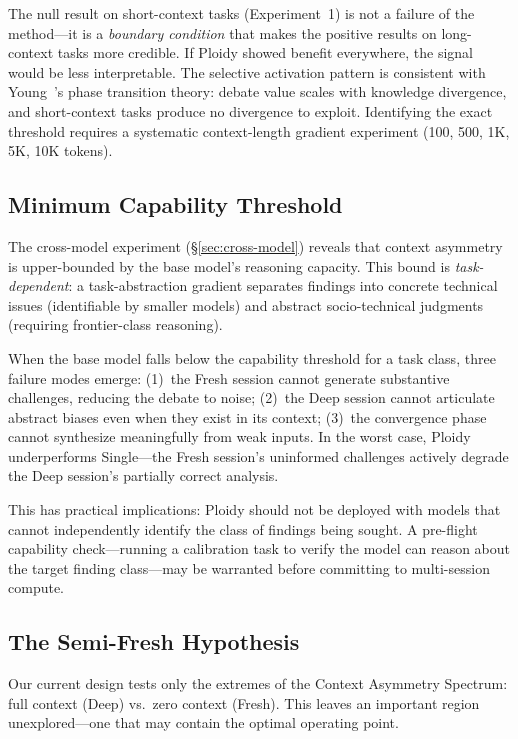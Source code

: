 \documentclass[11pt]{article}
\begin{document}
The null result on short-context tasks (Experiment~1) is not a failure of the method---it is a \emph{boundary condition} that makes the positive results on long-context tasks more credible. If Ploidy showed benefit everywhere, the signal would be less interpretable. The selective activation pattern is consistent with Young~\citep{young2026divergence}'s phase transition theory: debate value scales with knowledge divergence, and short-context tasks produce no divergence to exploit. Identifying the exact threshold requires a systematic context-length gradient experiment (100, 500, 1K, 5K, 10K tokens).

\subsection{Minimum Capability Threshold}
\label{sec:capability-threshold}

The cross-model experiment (\S\ref{sec:cross-model}) reveals that context asymmetry is upper-bounded by the base model's reasoning capacity. This bound is \emph{task-dependent}: a task-abstraction gradient separates findings into concrete technical issues (identifiable by smaller models) and abstract socio-technical judgments (requiring frontier-class reasoning).

When the base model falls below the capability threshold for a task class, three failure modes emerge: (1)~the Fresh session cannot generate substantive challenges, reducing the debate to noise; (2)~the Deep session cannot articulate abstract biases even when they exist in its context; (3)~the convergence phase cannot synthesize meaningfully from weak inputs. In the worst case, Ploidy underperforms Single---the Fresh session's uninformed challenges actively degrade the Deep session's partially correct analysis.

This has practical implications: Ploidy should not be deployed with models that cannot independently identify the class of findings being sought. A pre-flight capability check---running a calibration task to verify the model can reason about the target finding class---may be warranted before committing to multi-session compute.

\subsection{The Semi-Fresh Hypothesis}
\label{sec:semifresh}

Our current design tests only the extremes of the Context Asymmetry Spectrum: full context (Deep) vs.\ zero context (Fresh). This leaves an important region unexplored---one that may contain the optimal operating point.
\end{document}
